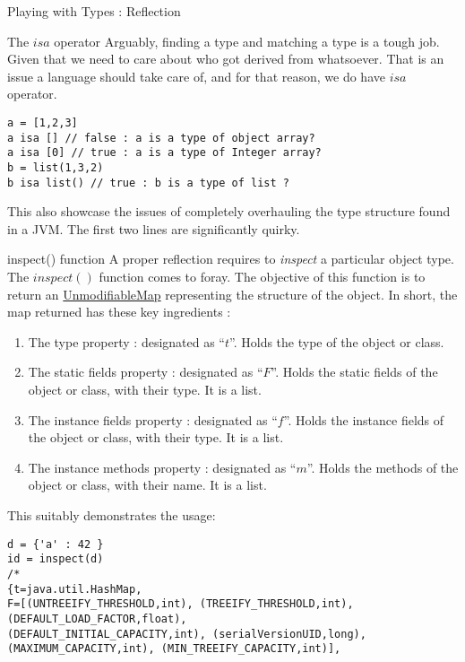 \begin{section}{Playing with Types : Reflection}
\begin{subsection}{The $isa$ operator}
Arguably, finding a type and matching a type is a tough job.
Given that we need to care about who got derived from whatsoever.
That is an issue a language should take care of, and for that reason, 
we do have $isa$ operator.

\begin{lstlisting}[style=JexlStyle]
a = [1,2,3] 
a isa [] // false : a is a type of object array?
a isa [0] // true : a is a type of Integer array?
b = list(1,3,2)
b isa list() // true : b is a type of list ? 
\end{lstlisting}
This also showcase the issues of completely overhauling the type 
structure found in a JVM. The first two lines are significantly quirky.

\end{subsection}

\begin{subsection}{inspect() function}
A proper reflection requires to \emph{inspect} a particular object type.
The $inspect()$ function comes to foray. The objective of this function 
is to return an \href{https://docs.oracle.com/javase/8/docs/api/java/util/Collections.html#unmodifiableMap-java.util.Map-}{UnmodifiableMap} 
representing the structure of the object. In short, the map returned has these key ingredients :

\begin{enumerate}
\item{The type property : designated as ``$t$''.  Holds the type of the object or class. }
\item{The static fields property : designated as ``$F$''.  
        Holds the static fields of the object or class, with their type. It is a list.}
\item{The instance fields property : designated as ``$f$''.  
        Holds the instance fields of the object or class, with their type. It is a list.}
\item{The instance methods property : designated as ``$m$''.  
        Holds the methods of the object or class, with their name. It is a list.}
\end{enumerate}

This suitably demonstrates the usage:

\begin{lstlisting}[style=JexlStyle]
d = {'a' : 42 }
id = inspect(d)
/*
{t=java.util.HashMap, 
F=[(UNTREEIFY_THRESHOLD,int), (TREEIFY_THRESHOLD,int), 
(DEFAULT_LOAD_FACTOR,float), 
(DEFAULT_INITIAL_CAPACITY,int), (serialVersionUID,long), 
(MAXIMUM_CAPACITY,int), (MIN_TREEIFY_CAPACITY,int)], 


\end{lstlisting}
\end{subsection}
\end{section}
